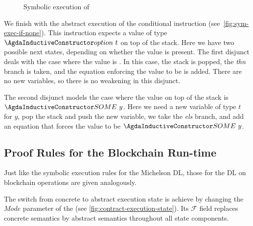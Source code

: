 \begin{figure}[tp]
  \AbstractProgStepIFNONE
  \caption{Symbolic execution of }
  \label{fig:sym-exec-if-none}
\end{figure}
We finish with the abstract execution of the conditional instruction
 (see~\autoref{fig:sym-exec-if-none}). This instruction
expects a value of type $\ACon{option}~t$ on top of the stack. Here we have two
possible next states, depending on whether the value is present. The
first disjunct deals with the case where the value is . In
this case, the stack is popped, the \emph{thn} branch is taken, and
the equation enforcing the value to be  is added. There are
no new variables, so there is no weakening in this disjunct.

The second disjunct models the case where the value on top of the stack is
$\ACon{SOME}~y$. Here we need a new variable of type $t$ for $y$, pop
the stack and push the new variable, we take the \emph{els} branch,
and add an equation that forces the value to be $\ACon{SOME}~y$.

\subsection{Proof Rules for the Blockchain Run-time}
\label{sec:calc-dl-blockch}

Just like the symbolic execution rules for the Michelson DL,
those for the DL on blockchain operations
are given analogously.
\AbstractUExecState
\AbstractAexecStep






The switch from concrete to abstract execution state is achieve by
changing the $Mode$ parameter of the  (see
\autoref{fig:contract-execution-state}). Its $\mathcal{F}$ field
replaces concrete semantics by abstract semantics throughout all state
components. 


